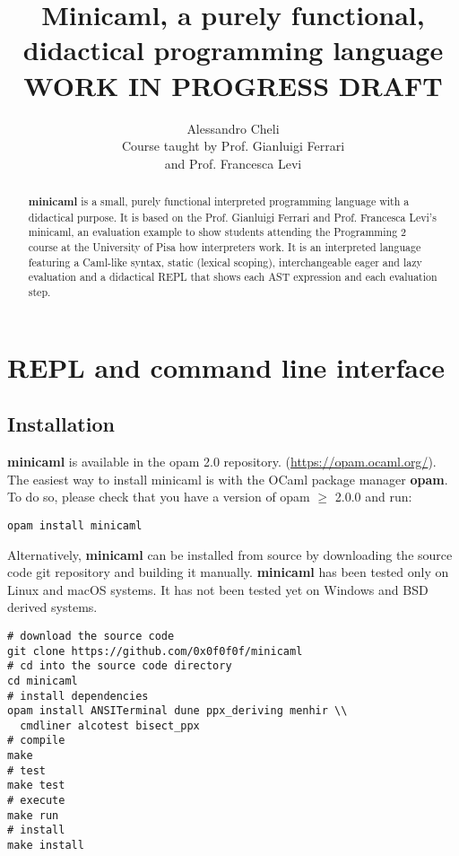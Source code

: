 \documentclass[a4paper, 11pt]{article}
\title{Minicaml, a purely functional, didactical programming language\\WORK IN PROGRESS DRAFT}
\author{Alessandro Cheli\\Course taught by Prof. Gianluigi Ferrari\\and Prof. Francesca Levi}
\begin{document}
\maketitle

\begin{abstract}
\textbf{minicaml} is a small, purely functional interpreted programming language
with a didactical purpose. It is based on the Prof. Gianluigi Ferrari and Prof.
Francesca Levi's minicaml, an evaluation example to show students attending the
Programming 2 course at the University of Pisa how interpreters work. It is an
interpreted language featuring a Caml-like syntax, static (lexical scoping),
interchangeable eager and lazy evaluation and a didactical REPL that
shows each AST expression and each evaluation step.
\end{abstract}

\section{REPL and command line interface}
\subsection{Installation}
\textbf{minicaml} is available in the opam 2.0 repository.
(\url{https://opam.ocaml.org/}). The easiest way to install minicaml is with the
OCaml package manager \textbf{opam}. To do so, please check that you have a version of opam $\geq$
2.0.0 and run:
\begin{lstlisting}[style=bash]
opam install minicaml
\end{lstlisting}
Alternatively, \textbf{minicaml} can be installed from source by downloading the
source code git repository and building it manually. \textbf{minicaml} has been tested
only on Linux and macOS systems. It has not been tested yet on Windows and BSD
derived systems.
\begin{lstlisting}[style=bash]
# download the source code
git clone https://github.com/0x0f0f0f/minicaml
# cd into the source code directory
cd minicaml
# install dependencies
opam install ANSITerminal dune ppx_deriving menhir \\
  cmdliner alcotest bisect_ppx
# compile
make
# test
make test
# execute
make run
# install
make install
\end{lstlisting}

\clearpage
\end{document}
